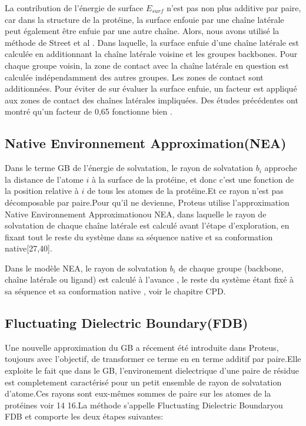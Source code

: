 La contribution de l'énergie de surface $E_{surf}$ n'est pas non plus additive par paire, car dans la structure de la protéine, la surface enfouie par une chaîne latérale peut également être enfuie par une autre chaîne. Alors, nous avons utilisé la méthode de Street et al \cite{Street98}. Dans laquelle, la surface enfuie d'une chaîne latérale est calculée en additionnant la chaîne latérale voisine et les groupes backbones. Pour chaque groupe voisin, la zone de contact avec la chaîne latérale en question est calculée indépendamment des autres groupes. Les zones de contact sont additionnées. Pour éviter de sur évaluer la surface enfuie, un facteur est appliqué aux zones de contact des chaînes latérales impliquées. Des études précédentes ont montré qu'un facteur de 0,65 fonctionne bien \cite{Lopes07,Gaillard14}.  

\subsection{\og Native Environnement Approximation\fg (NEA)}

Dans le terme GB de l'énergie de solvatation, le rayon de solvatation $b_i$ approche la distance de l'atome $i$ à la surface de la protéine, et donc c'est une fonction de la position relative à $i$ de tous les atomes de la protéine.Et ce rayon n'est pas décomposable par paire.Pour qu'il ne devienne, Proteus utilise l'approximation  \og Native Environnement Approximation\fg ou NEA, dans laquelle le rayon de solvatation de chaque chaîne latérale est calculé avant l'étape d'exploration, en fixant tout le reste du système dans sa séquence native et sa conformation native[27,40]. 

Dans le modèle NEA, le rayon de solvatation $b_i$ de chaque groupe (backbone, chaîne latérale ou ligand) est calculé à l'avance , le reste du système étant fixé à sa séquence et sa conformation native \cite{Simonson13b,Gaillard14}, voir le chapitre CPD.

\subsection{\og Fluctuating Dielectric Boundary\fg (FDB)}
\label{FDB}
Une nouvelle approximation du GB a récement été introduite dans Proteus, toujours avec l'objectif, de transformer ce terme en en terme additif par paire.Elle exploite le fait que dans le GB, l'environement dielectrique  d'une paire de résidue est completement caractérisé pour un petit ensemble de rayon de solvatation d'atome.Ces rayons sont eux-mêmes sommes de paire sur les atomes de la protéines voir 14 16.La méthode s'appelle Fluctuating Dielectric Boundary\fg ou FDB  et comporte les deux étapes suivantes:

